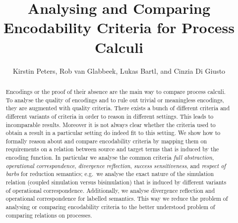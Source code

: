 \documentclass[11pt,a4paper]{article}
\begin{document}
\title{Analysing and Comparing Encodability Criteria for Process Calculi}
\author{Kirstin Peters, Rob van Glabbeek, Lukas Bartl, and Cinzia Di Giusto}
\date{}
\maketitle

\begin{abstract}
	Encodings or the proof of their absence are the main way to compare process calculi. To analyse the quality of encodings and to rule out trivial or meaningless encodings, they are augmented with quality criteria.
	There exists a bunch of different criteria and different variants of criteria in order to reason in different settings. This leads to incomparable results.
	Moreover it is not always clear whether the criteria used to obtain a result in a particular setting do indeed fit to this setting.
	We show how to formally reason about and compare encodability criteria by mapping them on requirements on a relation between source and target terms that is induced by the encoding function.
	In particular we analyse the common criteria \emph{full abstraction}, \emph{operational correspondence}, \emph{divergence reflection}, \emph{success sensitiveness}, and \emph{respect of barbs} for reduction semantics; e.g.\ we analyse the exact nature of the simulation relation (coupled simulation versus bisimulation) that is induced by different variants of operational correspondence.
	Additionally, we analyse divergence reflection and operational correspondence for labelled semantics.
	This way we reduce the problem of analysing or comparing encodability criteria to the better understood problem of comparing relations on processes.
\end{abstract}
\end{document}
